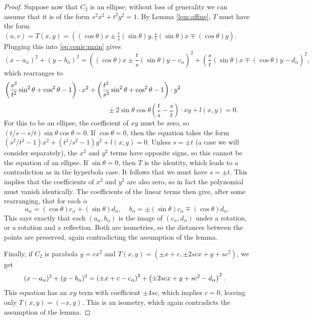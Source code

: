 \documentclass[12pt]{article}
\begin{document}
\begin{proof}
 Suppose now that $C_2$ is an ellipse; 
 without loss of generality we can assume that it is of the form $s^2x^2+t^2y^2 =1$.
 By Lemma \ref{lem:affine}, $T$ must have the form
 $(u,v) = T(x,y) = ((\cos\theta)x \pm \frac{t}{s} (\sin\theta)y, 
                     \frac{s}{t}(\sin\theta)x \mp(\cos\theta) y) $.
 Plugging this into \eqref{eq:conic:main} gives
 $$(x-a_\alpha)^2 + (y-b_\alpha)^2 
 = \left((\cos\theta)x \pm \frac{t}{s} (\sin\theta)y-c_\alpha\right)^2 + \left(\frac{s}{t}(\sin\theta)x \mp (\cos\theta) y-d_\alpha\right)^2,$$
 which rearranges to
 $$ \hspace{-100pt} \left(\frac{s^2}{t^2}\sin^2\theta +\cos^2\theta  -1\right)\cdot x^2 
  + \left(\frac{t^2}{s^2}\sin^2\theta + \cos^2\theta  -1\right)\cdot y^2 $$
 $$\hspace{160pt} \pm 2\sin\theta\cos\theta\left(\frac{t}{s} - \frac{s}{t}\right)\cdot xy + l(x,y) = 0.$$
 For this to be an ellipse, the coefficient of $xy$ must be zero,
 so $(t/s - s/t)\sin\theta\cos\theta=0$.
 If $\cos\theta =0$, then the equation takes the form 
 $(s^2/t^2 - 1) x^2 + (t^2/s^2-1) y^2  +l(x,y) = 0$.
 Unless $s=\pm t$ (a case we will consider separately), 
 the $x^2$ and $y^2$ terms have opposite signs, 
 so this cannot be the equation of an ellipse.
 If $\sin\theta = 0$, then $T$ is the identity, 
 which leads to a contradiction as in the hyperbola case.
 It follows that we must have $s= \pm t$.
 This implies that the coefficients of $x^2$ and $y^2$ are also zero, 
 so in fact the polynomial must vanish identically.
 The coefficients of the linear terms then give, after some rearranging, that for each $\alpha$
 $$a_\alpha = (\cos\theta) c_\alpha + (\sin\theta) d_\alpha,~~~~~ 
 b_\alpha = \pm(\sin\theta) c_\alpha \mp (\cos\theta)d_\alpha.$$
 This says exactly that each $(a_\alpha,b_\alpha)$ 
 is the image of $(c_\alpha,d_\alpha)$ under a rotation, 
 or a rotation and a reflection.
 Both are isometries, so the distances between the points are preserved, 
 again contradicting the assumption of the lemma.
   
 Finally, if $C_2$ is parabola $y = cx^2$ and $T(x,y) = (\pm x+c,\pm 2sc x + y + sc^2)$,
 we get 
 $$\hspace{-7pt}(x-a_\alpha)^2 + (y-b_\alpha)^2 = \left(\pm x + c-c_\alpha\right)^2 
 + \left(\pm 2sc x + y + sc^2-d_\alpha\right)^2.$$
 This equation has an $xy$ term with coefficient $\pm4sc$,
 which implies $c=0$, leaving only $T(x,y) = (-x,y)$.
 This is an isometry, which again contradicts the assumption of the lemma.
\end{proof}
   
\end{document}
